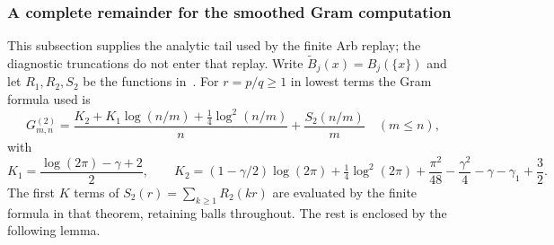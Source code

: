 \documentclass[11pt]{article}
\theoremstyle{remark}
\begin{document}
\subsubsection{A complete remainder for the smoothed Gram computation}
\label{sec:ns61-gram-remainder}

This subsection supplies the analytic tail used by the finite Arb replay;
the diagnostic truncations do not enter that replay. Write
$\widetilde B_j(x)=B_j(\{x\})$ and let $R_1,R_2,S_2$ be the
functions in~\cite[Theorem 2.1]{Ehm2024}. For $r=p/q\geq1$ in lowest
terms the Gram formula used is
\[
 G^{(2)}_{m,n}=\frac{K_2+K_1\log(n/m)+\tfrac14\log^2(n/m)}n
                  +\frac{S_2(n/m)}m\quad(m\leq n),
\]
with
\[
 K_1=\frac{\log(2\pi)-\gamma+2}{2},\qquad
 K_2=(1-\gamma/2)\log(2\pi)+\tfrac14\log^2(2\pi)
       +\frac{\pi^2}{48}-\frac{\gamma^2}{4}-\gamma-\gamma_1+\frac32.
\]
The first $K$ terms of $S_2(r)=\sum_{k\geq1}R_2(kr)$ are evaluated
by the finite formula in that theorem, retaining balls throughout.
The rest is enclosed by the following lemma.
\end{document}
